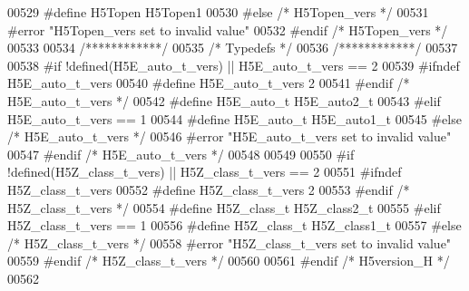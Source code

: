 \begin{DoxyCode}
00529 \textcolor{preprocessor}{  #define H5Topen H5Topen1}
00530 \textcolor{preprocessor}{#else }\textcolor{comment}{/* H5Topen\_vers */}\textcolor{preprocessor}{}
00531 \textcolor{preprocessor}{  #error "H5Topen\_vers set to invalid value"}
00532 \textcolor{preprocessor}{#endif }\textcolor{comment}{/* H5Topen\_vers */}\textcolor{preprocessor}{}
00533 
00534 \textcolor{comment}{/************/}
00535 \textcolor{comment}{/* Typedefs */}
00536 \textcolor{comment}{/************/}
00537 
00538 \textcolor{preprocessor}{#if !defined(H5E\_auto\_t\_vers) || H5E\_auto\_t\_vers == 2}
00539 \textcolor{preprocessor}{  #ifndef H5E\_auto\_t\_vers}
00540 \textcolor{preprocessor}{    #define H5E\_auto\_t\_vers 2}
00541 \textcolor{preprocessor}{  #endif }\textcolor{comment}{/* H5E\_auto\_t\_vers */}\textcolor{preprocessor}{}
00542 \textcolor{preprocessor}{  #define H5E\_auto\_t H5E\_auto2\_t}
00543 \textcolor{preprocessor}{#elif H5E\_auto\_t\_vers == 1}
00544 \textcolor{preprocessor}{  #define H5E\_auto\_t H5E\_auto1\_t}
00545 \textcolor{preprocessor}{#else }\textcolor{comment}{/* H5E\_auto\_t\_vers */}\textcolor{preprocessor}{}
00546 \textcolor{preprocessor}{  #error "H5E\_auto\_t\_vers set to invalid value"}
00547 \textcolor{preprocessor}{#endif }\textcolor{comment}{/* H5E\_auto\_t\_vers */}\textcolor{preprocessor}{}
00548 
00549 
00550 \textcolor{preprocessor}{#if !defined(H5Z\_class\_t\_vers) || H5Z\_class\_t\_vers == 2}
00551 \textcolor{preprocessor}{  #ifndef H5Z\_class\_t\_vers}
00552 \textcolor{preprocessor}{    #define H5Z\_class\_t\_vers 2}
00553 \textcolor{preprocessor}{  #endif }\textcolor{comment}{/* H5Z\_class\_t\_vers */}\textcolor{preprocessor}{}
00554 \textcolor{preprocessor}{  #define H5Z\_class\_t H5Z\_class2\_t}
00555 \textcolor{preprocessor}{#elif H5Z\_class\_t\_vers == 1}
00556 \textcolor{preprocessor}{  #define H5Z\_class\_t H5Z\_class1\_t}
00557 \textcolor{preprocessor}{#else }\textcolor{comment}{/* H5Z\_class\_t\_vers */}\textcolor{preprocessor}{}
00558 \textcolor{preprocessor}{  #error "H5Z\_class\_t\_vers set to invalid value"}
00559 \textcolor{preprocessor}{#endif }\textcolor{comment}{/* H5Z\_class\_t\_vers */}\textcolor{preprocessor}{}
00560 
00561 \textcolor{preprocessor}{#endif }\textcolor{comment}{/* H5version\_H */}\textcolor{preprocessor}{}
00562 
\end{DoxyCode}
